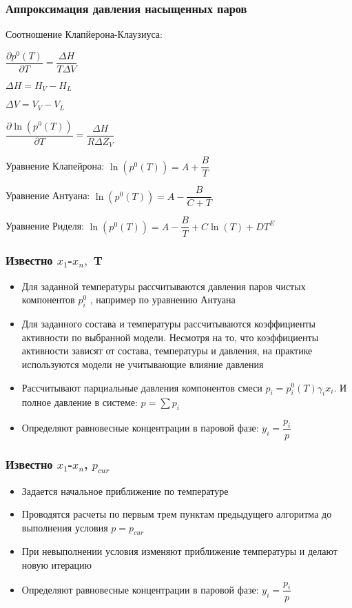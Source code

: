 \begin{frame}
	\frametitle{Аппроксимация давления насыщенных паров}
	Соотношение Клапйерона-Клаузиуса:
	
	$\dfrac{\partial p^0( T )} { \partial T } = \dfrac{ \Delta H } { T \Delta V }$
	
	$ \Delta H = H_V -H_L$
	
	$ \Delta V = V_V -V_L$
	
	$\dfrac{\partial \ln( p^0( T ))} { \partial T } = \dfrac{ \Delta H } { R \Delta Z_V }$
	
	Уравнение Клапейрона:
	 $\ln( p^0( T ))  = A + \dfrac{B} {T}$
	 
	 Уравнение Антуана:
	 $ \ln( p^0( T ))  = A - \dfrac{B} {C+T}$
	 
	 Уравнение Риделя:
	 $ \ln( p^0( T ))  = A - \dfrac{B} {T} + C \ln( T ) + D T^E$
\end{frame}


\begin{frame}
	\frametitle{Известно $x_1$-$x_n,$ T }
	\begin{itemize}
		\item Для заданной температуры рассчитываются давления паров чистых компонентов $p^0_i$ , например по уравнению Антуана
		\item Для заданного состава и температуры рассчитываются коэффициенты активности по выбранной модели. Несмотря на то, что коэффициенты активности зависят от состава, температуры и давления, на практике используются модели не учитывающие влияние давления
		\item Рассчитывают парциальные давления компонентов смеси $p_i = p_i^0( T ) \gamma_i x_i$. И полное давление в системе: $p= \sum p_i$
		\item Определяют равновесные концентрации в паровой фазе: $y_i = \dfrac{p_i} {p}$
	\end{itemize}
\end{frame}

\begin{frame}
	\frametitle{Известно $x_1$-$x_n$, $p_{cur}$ }
	\begin{itemize}
		\item Задается начальное приближение по температуре
		\item Проводятся расчеты по первым трем пунктам предыдущего алгоритма до выполнения условия $p=p_{cur}$
		\item При невыполнении условия изменяют приближение температуры и делают новую итерацию
		\item Определяют равновесные концентрации в паровой фазе: $y_i = \dfrac {p_i} {p}$
		
	\end{itemize}
	
\end{frame}


